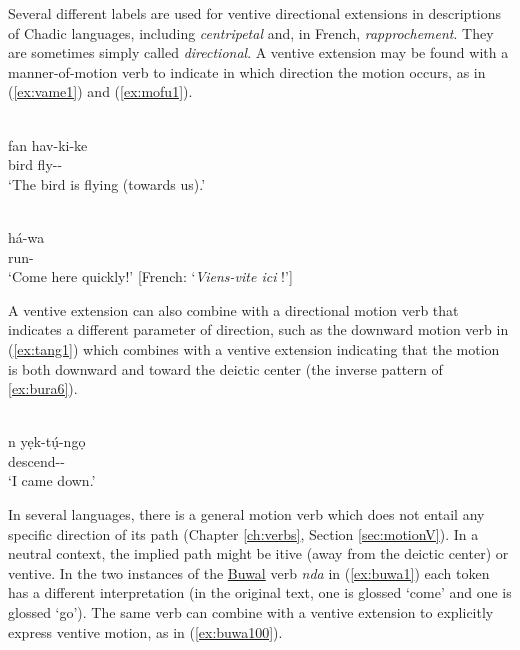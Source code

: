 Several different labels are used for ventive directional extensions in descriptions of Chadic languages, including \textit{centripetal} and, in French, \textit{rapprochement}. They are sometimes simply called \textit{directional}. A ventive extension may be found with a manner-of-motion verb to indicate in which direction the motion occurs, as in (\ref{ex:vame1}) and (\ref{ex:mofu1}).

\ea\label{ex:vame1}
 \\
\gll  fan hav-ki-ke	\\
bird fly--	\\
\glt `The bird is flying (towards us).'

\ex\label{ex:mofu1}
 \\
\gll há-wa \\
run- \\
\glt `Come here quickly!' [French: `\textit{Viens-vite ici} !']
\z 

A ventive extension can also combine with a directional motion verb that indicates a different parameter of direction, such as the downward motion verb in (\ref{ex:tang1}) which combines with a ventive extension indicating that the motion is both downward and toward the deictic center (the inverse pattern of \ref{ex:bura6}). 

\ea\label{ex:tang1}
 \\
\gll n yẹk-tụ́-ngọ	\\
 descend--	\\
\glt `I came down.'	
\z

In several languages, there is a general motion verb which does not entail any specific direction of its path (Chapter \ref{ch:verbs}, Section \ref{sec:motionV}). In a neutral context, the implied path might be itive (away from the deictic center) or ventive. In the two instances of the \hyperref[buwa]{Buwal} verb \textit{nda} in (\ref{ex:buwa1}) each token has a different interpretation (in the original text, one is glossed `come' and one is glossed `go'). The same verb can combine with a ventive extension to explicitly express ventive motion, as in (\ref{ex:buwa100}). 

